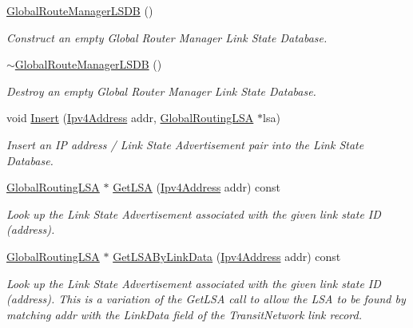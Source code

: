 \begin{DoxyCompactItemize}
\item 
\hyperlink{classns3_1_1GlobalRouteManagerLSDB_adfe8aa7db453286d5d37d55f539ceb20}{Global\+Route\+Manager\+L\+S\+DB} ()
\begin{DoxyCompactList}\small\item\em Construct an empty Global Router Manager Link State Database. \end{DoxyCompactList}\item 
\hyperlink{classns3_1_1GlobalRouteManagerLSDB_a46212375948ceb8f4825971008bc96d7}{$\sim$\+Global\+Route\+Manager\+L\+S\+DB} ()
\begin{DoxyCompactList}\small\item\em Destroy an empty Global Router Manager Link State Database. \end{DoxyCompactList}\item 
void \hyperlink{classns3_1_1GlobalRouteManagerLSDB_a832fe8b5361c7b4f680edfd98763346d}{Insert} (\hyperlink{classns3_1_1Ipv4Address}{Ipv4\+Address} addr, \hyperlink{classns3_1_1GlobalRoutingLSA}{Global\+Routing\+L\+SA} $\ast$lsa)
\begin{DoxyCompactList}\small\item\em Insert an IP address / Link State Advertisement pair into the Link State Database. \end{DoxyCompactList}\item 
\hyperlink{classns3_1_1GlobalRoutingLSA}{Global\+Routing\+L\+SA} $\ast$ \hyperlink{classns3_1_1GlobalRouteManagerLSDB_a3504bf3573cc64a056835684c41e1aa5}{Get\+L\+SA} (\hyperlink{classns3_1_1Ipv4Address}{Ipv4\+Address} addr) const 
\begin{DoxyCompactList}\small\item\em Look up the Link State Advertisement associated with the given link state ID (address). \end{DoxyCompactList}\item 
\hyperlink{classns3_1_1GlobalRoutingLSA}{Global\+Routing\+L\+SA} $\ast$ \hyperlink{classns3_1_1GlobalRouteManagerLSDB_aca4c2cb4c36f590198f203cddb30b493}{Get\+L\+S\+A\+By\+Link\+Data} (\hyperlink{classns3_1_1Ipv4Address}{Ipv4\+Address} addr) const 
\begin{DoxyCompactList}\small\item\em Look up the Link State Advertisement associated with the given link state ID (address). This is a variation of the Get\+L\+SA call to allow the L\+SA to be found by matching addr with the Link\+Data field of the Transit\+Network link record. \end{DoxyCompactList}\item 

\end{DoxyCompactItemize}
